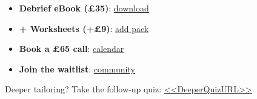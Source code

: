 \vspace{4pt}
\noindent{\color{brand}\rule{\linewidth}{0.8pt}}
{\small
\begin{itemize}
  \item \textbf{Debrief eBook (£35)}: \href{<<CTA_EbookURL>>}{download}
  \item \textbf{+ Worksheets (+£9)}: \href{<<CTA_WorksheetsURL>>}{add pack}
  \item \textbf{Book a £65 call}: \href{<<CTA_CallURL>>}{calendar}
  \item \textbf{Join the waitlist}: \href{<<CTA_WaitlistURL>>}{community}
\end{itemize}
Deeper tailoring? Take the follow-up quiz: \url{<<DeeperQuizURL>>}
}
